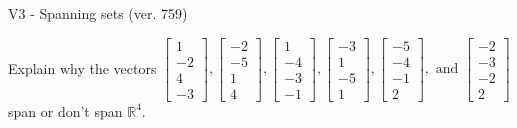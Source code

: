 \begin{exercise}
  \begin{exerciseTitle}V3 - Spanning sets (ver. 759)\end{exerciseTitle}
  \begin{exerciseStatement}
    Explain why the vectors \(\left[\begin{array}{r}
1 \\
-2 \\
4 \\
-3
\end{array}\right] , \left[\begin{array}{r}
-2 \\
-5 \\
1 \\
4
\end{array}\right] , \left[\begin{array}{r}
1 \\
-4 \\
-3 \\
-1
\end{array}\right] , \left[\begin{array}{r}
-3 \\
1 \\
-5 \\
1
\end{array}\right] , \left[\begin{array}{r}
-5 \\
-4 \\
-1 \\
2
\end{array}\right] , \text{ and } \left[\begin{array}{r}
-2 \\
-3 \\
-2 \\
2
\end{array}\right]\) span or don't span \(\mathbb{R}^4\). 
	



\end{exerciseStatement}
\end{exercise}
